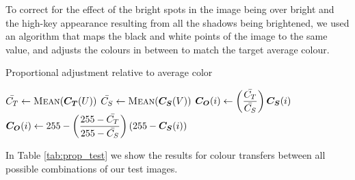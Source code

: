 To correct for the effect of the bright spots in the image being over bright and the high-key appearance resulting from all the shadows being brightened, we used an algorithm that maps the black and white points of the image to the same value, and adjusts the colours in between to match the target average colour.

\begin{algorithm}[H]
\caption{Proportional adjustment relative to average color}
\label{eq:prop_algo}
\begin{algorithmic}
\State $\mean{C_T} \gets \Call{Mean}{\vect{C_T}(U)}$
\State $\mean{C_S} \gets \Call{Mean}{\vect{C_S}(V)}$
\State $\boldsymbol{C_O}(i) \gets \displaystyle \left(\frac{\bar{C_T}}{\bar{C_S}}\right)\boldsymbol{C_S}(i)$
\Else
\State $\boldsymbol{C_O}(i) \gets \displaystyle 255 - \left(\frac{255 - \bar{C_T}}{255 - \bar{C_S}}\right)(255 - \boldsymbol{C_S}(i))$
\EndIf
\EndFor
\end{algorithmic}
\end{algorithm}

In Table \ref{tab:prop_test} we show the results for colour transfers between all possible combinations of our test images.


